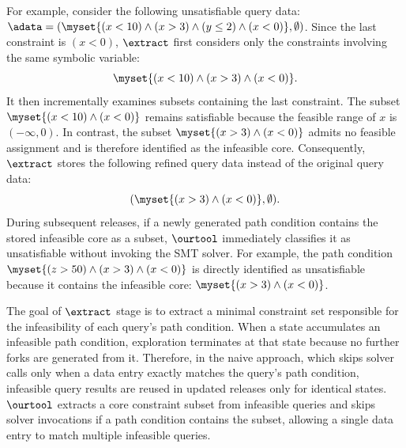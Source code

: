 For example, consider the following unsatisfiable query data: $\adata= (\myset{(x<10)\land(x>3)\land(y\le2)\land(x<0)},\emptyset)$. Since the last constraint is $(x<0)$, $\extract$ first considers only the constraints involving the same symbolic variable:
\[
\myset{(x<10)\land(x>3)\land(x<0)}.
\]
It then incrementally examines subsets containing the last constraint. The subset $\myset{(x<10)\land(x<0)}$ remains satisfiable because the feasible range of $x$ is $(-\infty,0)$. In contrast, the subset $\myset{(x>3)\land(x<0)}$ admits no feasible assignment and is therefore identified as the infeasible core. Consequently, $\extract$ stores the following refined query data instead of the original query data: 
\[
(\myset{(x>3)\land(x<0)},\emptyset).
\]
During subsequent releases, if a newly generated path condition contains the stored infeasible core as a subset, $\ourtool$ immediately classifies it as unsatisfiable without invoking the SMT solver. For example, the path condition $\myset{(z>50)\land(x>3)\land(x<0)}$ is directly identified as unsatisfiable because it contains the infeasible core: $\myset{(x>3)\land(x<0)}$.


\iffalse
{}
The goal of $\extract$ stage is to extract a minimal constraint set responsible for the infeasibility of each query’s path condition. When a state accumulates an infeasible path condition, exploration terminates at that state because no further forks are generated from it. Therefore, in the naive approach, which skips solver calls only when a data entry exactly matches the query’s path condition, infeasible query results are reused in updated releases only for identical states. $\ourtool$ extracts a core constraint subset from infeasible queries and skips solver invocations if a path condition contains the subset, allowing a single data entry to match multiple infeasible queries.

